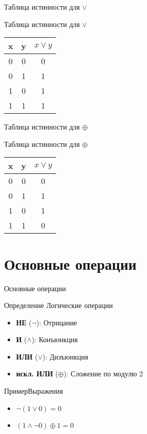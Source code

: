 \documentclass{beamer}
\newenvironment{rusdefinition}[1][Определение]{
    \begin{block}{#1}
}{\end{block}}
\newenvironment{rexample}[1][Пример]{\begin{exampleblock}{#1}}{\end{exampleblock}}
\begin{document}
\begin{frame}{Таблица истинности для $\lor$}
    \begin{block}{Таблица истинности для $\lor$}
        \begin{centering}
    \begin{tabular}{cc|c}
    x & y & $x \lor y$ \\ \hline
    0 & 0 & 0 \\
    0 & 1 & 1 \\
    1 & 0 & 1 \\
    1 & 1 & 1 \\
    \end{tabular}
\end{centering}
    \end{block}
    \end{frame}

    \begin{frame}{Таблица истинности для $\oplus$}
        \begin{block}{Таблица истинности для $\oplus$}
            \begin{centering}
        \begin{tabular}{cc|c}
        x & y & $x \lor y$ \\ \hline
        0 & 0 & 0 \\
        0 & 1 & 1 \\
        1 & 0 & 1 \\
        1 & 1 & 0 \\
        \end{tabular}
    \end{centering}
        \end{block}
        \end{frame}
    

\section{Основные операции}
\begin{frame}{Основные операции}
\begin{rusdefinition}{Логические операции}
\begin{itemize}
\item \textbf{НЕ} ($\neg$): Отрицание
\item \textbf{И} ($\land$): Конъюнкция
\item \textbf{ИЛИ} ($\lor$): Дизъюнкция
\item \textbf{искл. ИЛИ} ($\oplus$): Сложение по модулю 2 
\end{itemize}
\end{rusdefinition}

    \begin{rexample}{Выражения}
\begin{itemize}
\item $\neg(1 \lor 0) = 0$
\item $(1 \land \neg 0) \oplus 1 = 0$
\end{itemize}
\end{rexample}
\end{frame}
\end{document}
